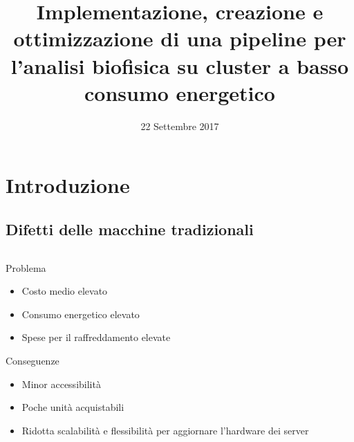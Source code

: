 \documentclass{beamer}
\title[]{\textbf{Implementazione, creazione e ottimizzazione di una pipeline per l'analisi biofisica su cluster a basso consumo energetico}}
\author[Daniele Dall'Olio]{Daniele Dall'Olio\\{\small Relatore: Dott. Enrico Giampieri \\ Correlatori: Prof. Gastone Castellani \and Ing. Andrea Ferraro}}
\date{22 Settembre 2017}
\institute[]{ALMA MATER STUDIORUM $\cdot$ UNIVERSIT\'A DI BOLOGNA}
\begin{document}
\begin{frame}
\maketitle
\end{frame}

\section{Introduzione}


\subsection{Difetti delle macchine tradizionali}

\begin{frame}
\begin{columns}
\begin{column}{0.8\linewidth}
			
\begin{block}{Problema}
\begin{itemize}
\item Costo medio elevato
\item Consumo energetico elevato
\item Spese per il raffreddamento elevate
\end{itemize}
\begin{block}{Conseguenze}
\begin{itemize}
\item Minor accessibilità
\item Poche unità acquistabili
\item Ridotta scalabilità e flessibilità per aggiornare l’hardware dei server
\end{itemize}
\end{block}
\end{block}
\end{column}
\end{columns}
\end{frame}	
\end{document}
